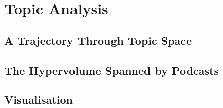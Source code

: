 \section{Topic Analysis}
\subsection{A Trajectory Through Topic Space}
\subsection{The Hypervolume Spanned by Podcasts}
\subsection{Visualisation}